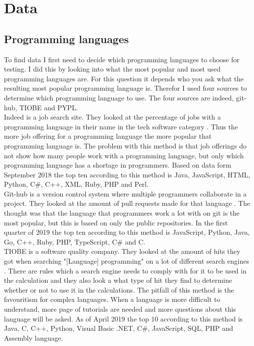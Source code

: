 \chapter{Data}
\label{ch:data}

\section{Programming languages}
To find data I first need to decide which programming languages to choose for testing. I did this by looking into what the most popular and most used programming languages are. For this question it depends who you ask what the resulting most popular programming language is. Therefor I used four sources to determine which programming language to use. The four sources are indeed, git-hub, TIOBE and PYPL.\\

Indeed is a job search site. They looked at the percentage of jobs with a programming language in their name in the tech software category \cite{ray:2018}. Thus the more job offering for a programming language the more popular that programming language is. The problem with this method is that job offerings do not show how many people work with a programming language, but only which programming language has a shortage in programmers. Based on data form September 2018 the top ten according to this method is Java, JavaScript, HTML, Python, C\#, C++, XML, Ruby, PHP and Perl.\\

Git-hub is a version control system where multiple programmers collaborate in a project. They looked at the amount of pull requests made for that language \cite{zap:2019}. The thought was that the language that programmers work a lot with on git is the most popular, but this is based on only the public repositories. In the first quarter of 2019 the top ten according to this method is JavaScript, Python, Java, Go, C++, Ruby, PHP, TypeScript, C\# and C. \\

TIOBE is a software quality company. They looked at the amount of hits they got when searching "[Language] programming" on a lot of different search engines \cite{tio:2019}. There are rules which a search engine needs to comply with for it to be used in the calculation and they also look a what type of hit they find to determine whether or not to use it in the calculations. The pitfall of this method is the favouritism for complex languages. When a language is more difficult to understand, more page of tutorials are needed and more questions about this language will be asked. As of April 2019 the top 10 according to this method is Java, C, C++, Python, Visual Basic .NET, C\#, JavaScript, SQL, PHP and Assembly language.\\

